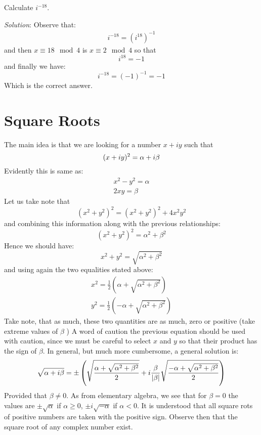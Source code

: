 \begin{mdframed}
	Calculate $i^{-18}$.
	
	\textit{Solution}: Observe that:
	\begin{align*}
	i^{-18} = (i^{18})^{-1}
	\end{align*}
	and then $ x \equiv 18 \mod{4} $ is $ x \equiv 2 \mod{4} $ so that 
	\[ i^{18} = -1 \]
	and finally we have:
	\[ i^{-18} = (-1)^{-1} = -1 \]
	Which is the correct answer.
	
\end{mdframed}

\section{Square Roots}
The main idea is that we are looking for a number $ x + iy$ such that
\[ 
(x + iy)^{2} = \alpha + i \beta 
 \]
 Evidently this is same as:
 \begin{align*}
 x^2 - y^2 = \alpha \\
 2xy = \beta
 \end{align*}
Let us take note that
\[ 
(x^{2}+y^{2})^{2} = (x^2 + y^2)^2 + 4x^2y^2
\]
and combining this information along with the previous relationships:
\[ (x^{2}+y^{2})^{2} = \alpha^2 + \beta^2 \]
Hence we should have:
\[ x^2 + y^2 = \sqrt{ \alpha^2 + \beta^2 } \]
and using again the two equalities stated above:
\begin{align*}
x^2 = \frac{1}{2}( \alpha + \sqrt{\alpha^2 + \beta^2}) \\
y^2 = \frac{1}{2}( -\alpha + \sqrt{ \alpha^2 + \beta^2}  )
\end{align*}
Take note, that as much, these two quantities are as much, zero or positive (take extreme values of $\beta$ )
A word of caution the previous equation should be used with caution, since we must be careful to select $x$ and $y$ so that their product has the sign of $\beta$.
In general, but much more cumbersome, a general solution is:
 \begin{align*}
  \sqrt{\alpha + i \beta }= \pm \left( \sqrt{ \frac{ \alpha + \sqrt{\alpha^2 + \beta^2} }{2}} + i \frac{\beta}{\left| \beta \right|} \sqrt{ \frac{ -\alpha + \sqrt{\alpha^2 + \beta^2}}{2}} \right)
 \end{align*}
 Provided that $ \beta \neq 0 $. As from elementary algebra, we see that for $ \beta = 0$ the values are $ \pm \sqrt{\alpha} $ if $ \alpha \geq 0$, $\pm i \sqrt{-\alpha} $ if $ \alpha < 0$. It is understood that all square rots of positive numbers are taken with the positive sign.
 Observe then that the square root of any complex number exist.
 
